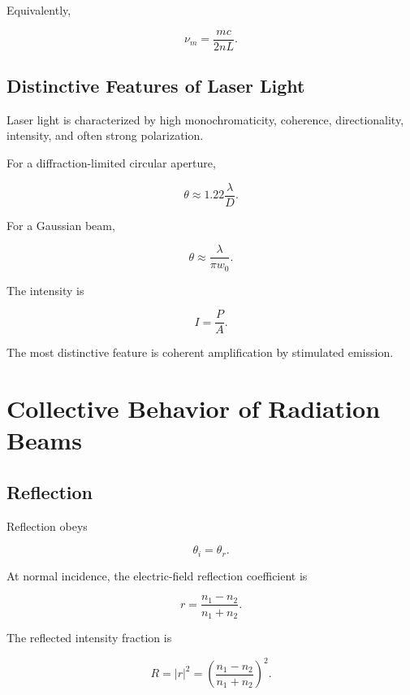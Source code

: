 \documentclass[12pt]{article}
\begin{document}
Equivalently,

\begin{equation}
\nu_m=\frac{mc}{2nL}.
\end{equation}

\subsection{Distinctive Features of Laser Light}

Laser light is characterized by high monochromaticity, coherence, directionality, intensity, and often strong polarization.

For a diffraction-limited circular aperture,

\begin{equation}
\theta\approx1.22\frac{\lambda}{D}.
\end{equation}

For a Gaussian beam,

\begin{equation}
\theta\approx\frac{\lambda}{\pi w_0}.
\end{equation}

The intensity is

\begin{equation}
I=\frac{P}{A}.
\end{equation}

The most distinctive feature is coherent amplification by stimulated emission.

\section{Collective Behavior of Radiation Beams}

\subsection{Reflection}

Reflection obeys

\begin{equation}
\boxed{\theta_i=\theta_r}.
\end{equation}

At normal incidence, the electric-field reflection coefficient is

\begin{equation}
r=\frac{n_1-n_2}{n_1+n_2}.
\end{equation}

The reflected intensity fraction is

\begin{equation}
\boxed{
R=|r|^2
=
\left(\frac{n_1-n_2}{n_1+n_2}\right)^2
}.
\end{equation}
\end{document}
